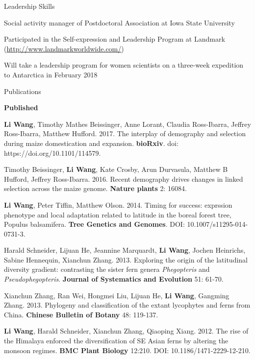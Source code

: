 \documentclass{resume} %
\begin{document}
\begin{rSection}{Leadership Skills}{}{}
\item Social activity manager of Postdoctoral Association at Iowa State University
\item Participated in the Self-expression and Leadership Program at Landmark (\url{http://www.landmarkworldwide.com/})
\item Will take a leadership program for women scientists on a three-week expedition to Antarctica in February 2018
\end{rSection}

\begin{rSection}{Publications}{}{}
\begin{rSubsection}{\textbf{Published}}{}{}{}

\item \textbf{Li Wang}, Timothy Mathes Beissinger, Anne Lorant, Claudia Ross-Ibarra, Jeffrey Ross-Ibarra, Matthew Hufford. 2017. The interplay of demography and selection during maize domestication and expansion. \textbf{bioRxiv}. doi: https://doi.org/10.1101/114579. 

\item Timothy Beissinger, \textbf{Li Wang}, Kate Crosby, Arun Durvasula, Matthew B Hufford, Jeffrey Ross-Ibarra. 2016. Recent demography drives changes in linked selection across the maize genome. \textbf{Nature plants} 2: 16084. 

\item \textbf{Li Wang}, Peter Tiffin, Matthew Olson. 2014. Timing for success: exprssion phenotype and local adaptation related to latitude in the boreal forest tree, Populus balsamifera. \textbf{Tree Genetics and Genomes}. DOI: 10.1007/s11295-014-0731-3. 

\item Harald Schneider, Lijuan He, Jeannine Marquardt, \textbf{Li Wang}, Jochen Heinrichs, Sabine Hennequin, Xianchun Zhang. 2013. Exploring the origin of the latitudinal diversity gradient: contrasting the sister fern genera \textit{Phegopteris} and \textit{Pseudophegopteris}. \textbf{Journal of Systematics and Evolution} 51: 61-70.

\item Xianchun Zhang, Ran Wei, Hongmei Liu, Lijuan He, \textbf{Li Wang}, Gangming Zhang. 2013. Phylogeny and classification of the extant lycophytes and ferns from China. \textbf{Chinese Bulletin of Botany} 48: 119-137.


\item \textbf{Li Wang}, Harald Schneider, Xianchun Zhang, Qiaoping Xiang. 2012. The rise of the Himalaya enforced the diversification of SE Asian ferns by altering the monsoon regimes. \textbf{BMC Plant Biology} 12:210. DOI: 10.1186/1471-2229-12-210. 


\end{rSubsection}
\end{rSection}
\end{document}
